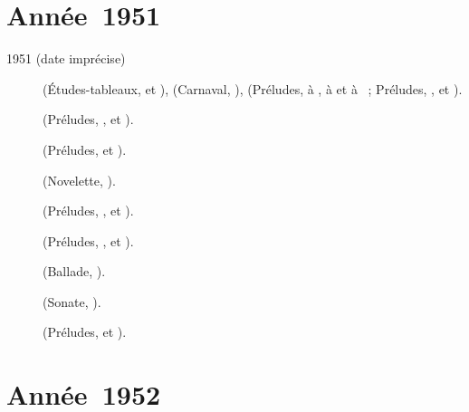 \section{Année~1951}

\begin{description}
 \item[1951 (date imprécise)]
 \Rachmaninov{} (Études-tableaux,    et 
 ), \Schumann{} (Carnaval, ), \Scriabine{} (Préludes,
   à ,  à  et
  à ~; Préludes,  , 
  et  ).
 \item[]
 \Chopin{} (Préludes,  ,  et ).
 \item[]
 \Chopin{} (Préludes,   et ).
 \item[]
 \Liadov{} (Novelette, ).
 \item[]
 \Chopin{} (Préludes,  ,  et ).
 \item[]
 \Chopin{} (Préludes,  ,  et ).
 \item[]
 \Chopin{} (Ballade, ).
 \item[]
 \Beethoven{} (Sonate, ).
 \item[]
 \Chopin{} (Préludes,   et ).
\end{description}

\section{Année~1952}

